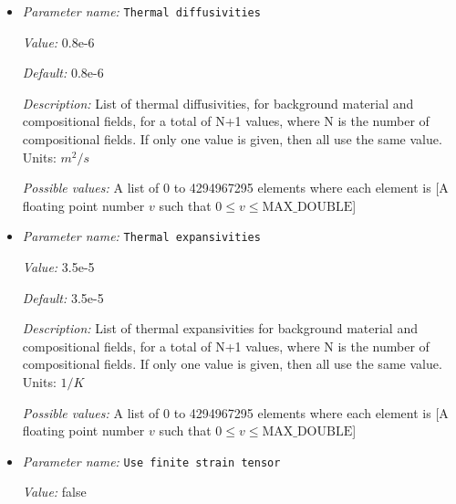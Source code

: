 \begin{itemize}
{\it Possible values:} A list of 0 to 4294967295 elements where each element is [A floating point number $v$ such that $0 \leq v \leq \text{MAX\_DOUBLE}$]
\item {\it Parameter name:} {\tt Thermal diffusivities}
\label{parameters:Material model/Visco Plastic/Thermal diffusivities}
\label{parameters:Material_20model/Visco_20Plastic/Thermal_20diffusivities}


{\it Value:} 0.8e-6


{\it Default:} 0.8e-6


{\it Description:} List of thermal diffusivities, for background material and compositional fields, for a total of N+1 values, where N is the number of compositional fields. If only one value is given, then all use the same value.  Units: $m^2/s$


{\it Possible values:} A list of 0 to 4294967295 elements where each element is [A floating point number $v$ such that $0 \leq v \leq \text{MAX\_DOUBLE}$]
\item {\it Parameter name:} {\tt Thermal expansivities}
\label{parameters:Material model/Visco Plastic/Thermal expansivities}
\label{parameters:Material_20model/Visco_20Plastic/Thermal_20expansivities}


{\it Value:} 3.5e-5


{\it Default:} 3.5e-5


{\it Description:} List of thermal expansivities for background material and compositional fields, for a total of N+1 values, where N is the number of compositional fields. If only one value is given, then all use the same value.  Units: $1 / K$


{\it Possible values:} A list of 0 to 4294967295 elements where each element is [A floating point number $v$ such that $0 \leq v \leq \text{MAX\_DOUBLE}$]
\item {\it Parameter name:} {\tt Use finite strain tensor}
\label{parameters:Material model/Visco Plastic/Use finite strain tensor}
\label{parameters:Material_20model/Visco_20Plastic/Use_20finite_20strain_20tensor}


{\it Value:} false



\end{itemize}
